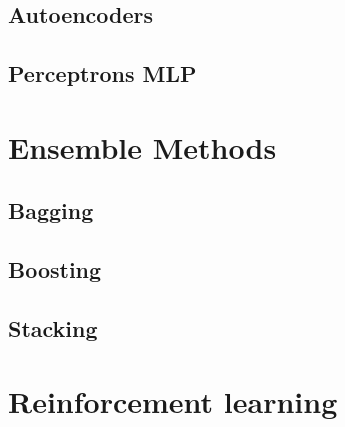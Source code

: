 \documentclass[a4paper,titlepage]{article}
\numberwithin{equation}{section} %
\begin{document}

\subsection{Autoencoders}



\subsection{Perceptrons MLP}




\newpage



\section{Ensemble Methods}




\subsection{Bagging}



\subsection{Boosting}



\subsection{Stacking}


\newpage


\section{Reinforcement learning}
\end{document}
